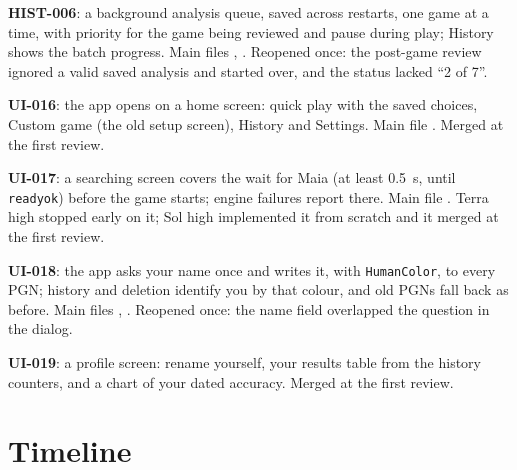 \documentclass[11pt,a4paper]{article}
\begin{document}
\textbf{HIST-006}: a background analysis queue, saved across restarts, one game at a time, with
priority for the game being reviewed and pause during play; History shows the batch progress.
Main files , . Reopened once: the
post-game review ignored a valid saved analysis and started over, and the status lacked
``2 of 7''.

\textbf{UI-016}: the app opens on a home screen: quick play with the saved choices, Custom game
(the old setup screen), History and Settings. Main file . Merged at the first
review.

\textbf{UI-017}: a searching screen covers the wait for Maia (at least 0.5~s, until
\texttt{readyok}) before the game starts; engine failures report there. Main file
. Terra high stopped early on it; Sol high implemented it from scratch and it
merged at the first review.

\textbf{UI-018}: the app asks your name once and writes it, with \texttt{HumanColor}, to every
PGN; history and deletion identify you by that colour, and old PGNs fall back as before. Main
files , . Reopened once: the name field overlapped
the question in the dialog.

\textbf{UI-019}: a profile screen: rename yourself, your results table from the history
counters, and a chart of your dated accuracy. Merged at the first review.

\section*{Timeline}
\end{document}
